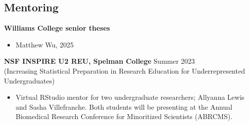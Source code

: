 \documentclass[margin, 10pt]{res}
\begin{document}
\begin{resume}
\section{Mentoring}
{\textbf{Williams College senior theses}}
\begin{itemize}
\item Matthew Wu, 2025
\end{itemize}
{\textbf{NSF INSPIRE U2 REU, Spelman College}} \hfill Summer 2023 \\
(Increasing Statistical Preparation in Research Education for Underrepresented Undergraduates)
\begin{itemize}
\item Virtual RStudio mentor for two undergraduate researchers; 
Allyanna Lewis and Sasha Villefranche. Both students will be presenting at the Annual Biomedical Research Conference for Minoritized Scientists (ABRCMS). 
\end{itemize}


\end{resume}
\end{document}
